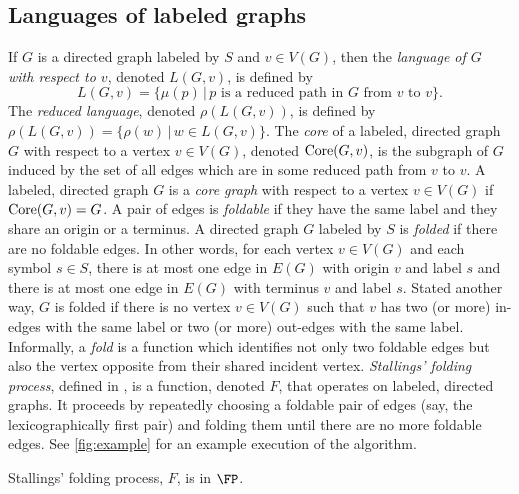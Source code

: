 \documentclass{article}
\newcommand{\Core}{\textnormal{Core}}
\begin{document}
\subsection{Languages of labeled graphs}

If $G$ is a directed graph labeled by $S$ and $v \in V(G)$, then the \emph{language of $G$ with respect to $v$}, denoted $L(G, v)$, is defined by
\begin{equation*}
  L(G, v) = \{ \mu(p) \, | \, p \text{ is a reduced path in } G \text{ from } v \text{ to } v\}.
\end{equation*}
The \emph{reduced language}, denoted $\rho(L(G, v))$, is defined by $\rho(L(G, v)) = \{ \rho(w) \, | \, w \in L(G, v) \}$.
The \emph{core} of a labeled, directed graph $G$ with respect to a vertex $v \in V(G)$, denoted $\Core(G, v)$, is the subgraph of $G$ induced by the set of all edges which are in some reduced path from $v$ to $v$.
A labeled, directed graph $G$ is a \emph{core graph} with respect to a vertex $v \in V(G)$ if $\Core(G, v) = G$.
A pair of edges is \emph{foldable} if they have the same label and they share an origin or a terminus.
A directed graph $G$ labeled by $S$ is \emph{folded} if there are no foldable edges.
In other words, for each vertex $v \in V(G)$ and each symbol $s \in S$, there is at most one edge in $E(G)$ with origin $v$ and label $s$ and there is at most one edge in $E(G)$ with terminus $v$ and label $s$.
Stated another way, $G$ is folded if there is no vertex $v \in V(G)$ such that $v$ has two (or more) in-edges with the same label or two (or more) out-edges with the same label.
Informally, a \emph{fold} is a function which identifies not only two foldable edges but also the vertex opposite from their shared incident vertex.
\emph{Stallings' folding process}, defined in \autocite[Algorithm~5.4]{stallings83}, is a function, denoted $F$, that operates on labeled, directed graphs.
It proceeds by repeatedly choosing a foldable pair of edges (say, the lexicographically first pair) and folding them until there are no more foldable edges.
See \autoref{fig:example} for an example execution of the algorithm.



\begin{theorem}\label{thm:finfp}
  Stallings' folding process, $F$, is in $\FP$.
\end{theorem}
\end{document}
